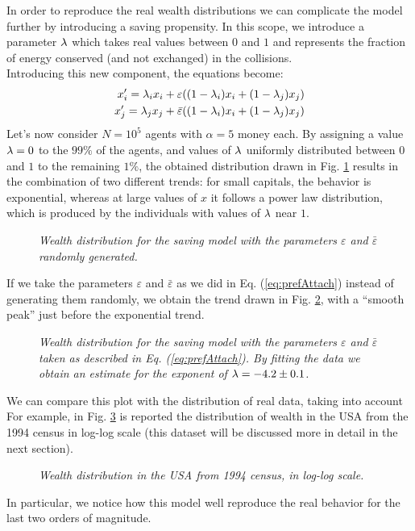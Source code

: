 In order to reproduce the real wealth distributions we can complicate the model further by introducing a saving propensity.
In this scope, we introduce a parameter $\lambda$ which takes real values between $0$ and $1$ and represents the fraction of energy conserved (and not exchanged) in the collisions. \\
Introducing this new component, the equations become:
\begin{equation}
	\begin{split}
		x'_i = \lambda_ix_i + \varepsilon((1-\lambda_i)x_i + (1-\lambda_j)x_j) 	\\
		x'_j = \lambda_jx_j + \bar{\varepsilon}((1-\lambda_i)x_i + (1-\lambda_j)x_j) 	\\
	\end{split}
\end{equation}
Let's now consider $N = 10^5$ agents with $\alpha = 5$ money each.
By assigning a value $\lambda = 0$ to the $99 \%$ of the agents, and values of $\lambda$ uniformly distributed between $0$ and $1$ to the remaining $1\%$, the obtained distribution drawn in Fig. \ref{fig:savings} results in the combination of two different trends: for small capitals, the behavior is exponential, whereas at large values of $x$ it follows a power law distribution, which is produced by the individuals with values of $\lambda$ near $1$.
\begin{figure}[H]
    \centering
    \scalebox{.7}{}
    \caption{\emph{Wealth distribution for the saving model with the parameters $\varepsilon$ and $\bar{\varepsilon}$ randomly generated.}}
    \label{fig:savings}
\end{figure}
If we take the parameters $\varepsilon$ and $\bar{\varepsilon}$ as we did in Eq. (\ref{eq:prefAttach}) instead of generating them randomly, we obtain the trend drawn in Fig. \ref{fig:savingsPref}, with a ``smooth peak'' just before the exponential trend.
\begin{figure}[H]
    \centering
    \scalebox{.7}{}
    \caption{\emph{Wealth distribution for the saving model with the parameters $\varepsilon$ and $\bar{\varepsilon}$ taken as described in Eq. (\ref{eq:prefAttach}). By fitting the data we obtain an estimate for the exponent of $\lambda = -4.2 \pm 0.1$.}}
    \label{fig:savingsPref}
\end{figure}
We can compare this plot with the distribution of real data, taking into account 
For example, in Fig. \ref{fig:savingsLog} is reported the distribution of wealth in the USA from the 1994 census in log-log scale (this dataset will be discussed more in detail in the next section).
\begin{figure}[H]
    \centering
    \scalebox{.7}{}
    \caption{\emph{Wealth distribution in the USA from 1994 census, in log-log scale.}}
    \label{fig:savingsLog}
\end{figure}
In particular, we notice how this model well reproduce the real behavior for the last two orders of magnitude.
